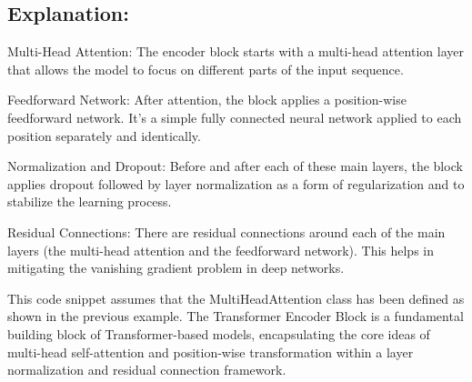 \documentclass[11pt]{article}
\begin{document}
\subsection{Explanation:}\label{explanation}

Multi-Head Attention: The encoder block starts with a multi-head
attention layer that allows the model to focus on different parts of the
input sequence.

Feedforward Network: After attention, the block applies a position-wise
feedforward network. It's a simple fully connected neural network
applied to each position separately and identically.

Normalization and Dropout: Before and after each of these main layers,
the block applies dropout followed by layer normalization as a form of
regularization and to stabilize the learning process.

Residual Connections: There are residual connections around each of the
main layers (the multi-head attention and the feedforward network). This
helps in mitigating the vanishing gradient problem in deep networks.

This code snippet assumes that the MultiHeadAttention class has been
defined as shown in the previous example. The Transformer Encoder Block
is a fundamental building block of Transformer-based models,
encapsulating the core ideas of multi-head self-attention and
position-wise transformation within a layer normalization and residual
connection framework.
\end{document}
